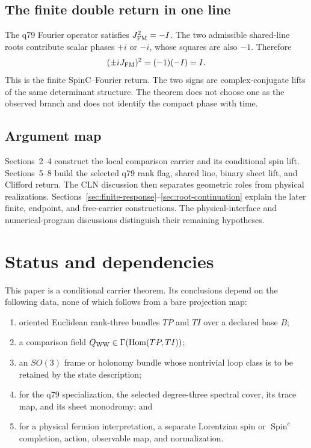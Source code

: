 \documentclass[11pt]{article}
\begin{document}
\subsection{The finite double return in one line}

The q79 Fourier operator satisfies $J_{\rm FM}^2=-I$.  The two admissible
shared-line roots contribute scalar phases $+i$ or $-i$, whose squares are
also $-1$.  Therefore
\[
 (\pm iJ_{\rm FM})^2=(-1)(-I)=I.
\]
This is the finite SpinC--Fourier return.  The two signs are complex-conjugate
lifts of the same determinant structure.  The theorem does not choose one as
the observed branch and does not identify the compact phase with time.

\subsection{Argument map}

Sections~2--4 construct the local comparison carrier and its conditional spin
lift.  Sections~5--8 build the selected q79 rank flag, shared line, binary
sheet lift, and Clifford return. The CLN discussion then separates geometric
roles from physical realizations. Sections~\ref{sec:finite-response}--\ref{sec:root-continuation}
explain the later finite, endpoint, and free-carrier constructions. The
physical-interface and numerical-program discussions distinguish their
remaining hypotheses.

\section{Status and dependencies}

This paper is a conditional carrier theorem.  Its conclusions depend on the
following data, none of which follows from a bare projection map:
\begin{enumerate}
\item oriented Euclidean rank-three bundles $TP$ and $TI$ over a declared
base $B$;
\item a comparison field $Q_{\rm WW}\in
\Gamma(\operatorname{Hom}(TP,TI))$;
\item an $SO(3)$ frame or holonomy bundle whose nontrivial loop class is to be
retained by the state description;
\item for the q79 specialization, the selected degree-three spectral cover,
its trace map, and its sheet monodromy; and
\item for a physical fermion interpretation, a separate Lorentzian spin or
$\operatorname{Spin}^c$ completion, action, observable map, and normalization.
\end{enumerate}
\end{document}
